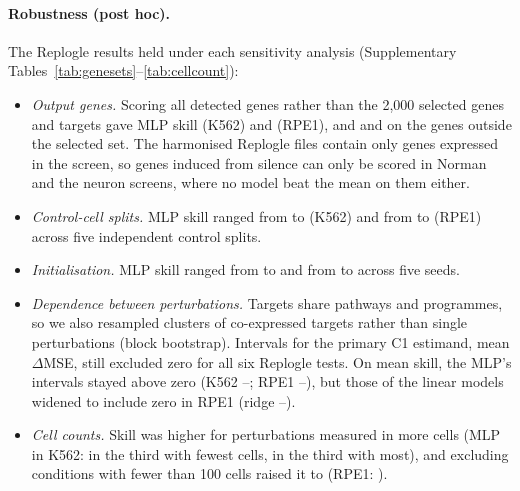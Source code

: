 \paragraph{Robustness (post hoc).} The Replogle results held under each sensitivity analysis (Supplementary Tables~\ref{tab:genesets}--\ref{tab:cellcount}):
\begin{itemize}
\item \emph{Output genes.} Scoring all detected genes rather than the 2{,}000 selected genes and targets gave MLP skill \numGsReplogleKEssentialMlpEnsembleExtended{} (K562) and \numGsReplogleRpeMlpEnsembleExtended{} (RPE1), and \numGsReplogleKEssentialMlpEnsembleOutsidePrimary{} and \numGsReplogleRpeMlpEnsembleOutsidePrimary{} on the genes outside the selected set. The harmonised Replogle files contain only genes expressed in the screen, so genes induced from silence can only be scored in Norman and the neuron screens, where no model beat the mean on them either.
\item \emph{Control-cell splits.} MLP skill ranged from \numCsMinReplogleKEssentialMlpEnsemble{} to \numCsMaxReplogleKEssentialMlpEnsemble{} (K562) and from \numCsMinReplogleRpeMlpEnsemble{} to \numCsMaxReplogleRpeMlpEnsemble{} (RPE1) across five independent control splits.
\item \emph{Initialisation.} MLP skill ranged from \numSeedMinReplogleKEssentialMlpEnsemble{} to \numSeedMaxReplogleKEssentialMlpEnsemble{} and from \numSeedMinReplogleRpeMlpEnsemble{} to \numSeedMaxReplogleRpeMlpEnsemble{} across five seeds.
\item \emph{Dependence between perturbations.} Targets share pathways and programmes, so we also resampled clusters of co-expressed targets rather than single perturbations (block bootstrap). Intervals for the primary C1 estimand, mean $\Delta$MSE, still excluded zero for all six Replogle tests. On mean skill, the MLP's intervals stayed above zero (K562 \numBlockLoReplogleKEssentialMlpEnsemble--\numBlockHiReplogleKEssentialMlpEnsemble; RPE1 \numBlockLoReplogleRpeMlpEnsemble--\numBlockHiReplogleRpeMlpEnsemble), but those of the linear models widened to include zero in RPE1 (ridge \numBlockLoReplogleRpeRidge--\numBlockHiReplogleRpeRidge).
\item \emph{Cell counts.} Skill was higher for perturbations measured in more cells (MLP in K562: \numCcFewestReplogleKEssentialMlpEnsemble{} in the third with fewest cells, \numCcMostReplogleKEssentialMlpEnsemble{} in the third with most), and excluding conditions with fewer than 100 cells raised it to \numCcHundredReplogleKEssentialMlpEnsemble{} (RPE1: \numCcHundredReplogleRpeMlpEnsemble).
\end{itemize}

